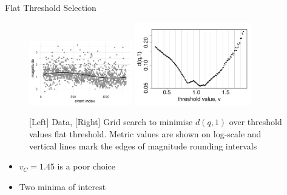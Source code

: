 \begin{frame}{Flat Threshold Selection}
    \begin{figure}
    \centering
     \qquad
        \includegraphics[width = 0.4\textwidth]{images/motivating_data/groningen_catalogue_index.png} 
    \includegraphics[width = 0.45\textwidth]{images/groningen_application/flat_threshold_selection/groningen_flat_metric_values.pdf}
    \caption{[Left] Data,  [Right] Grid search to minimise $d(q,1)$ over threshold values flat threshold. Metric values are shown on log-scale and vertical lines mark the edges of magnitude rounding intervals}
    \label{fig:groningen_flat_selection_metrics_values}
\end{figure}
\begin{itemize}
\item $v_C=1.45$ is a poor choice 
\item Two minima of interest
\end{itemize}
\end{frame}


